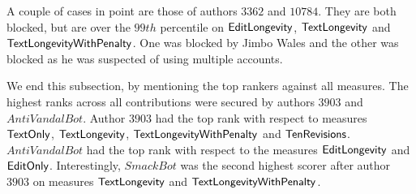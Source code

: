 A couple of cases in point are those of authors $3362$ and 
$10784$.
They are both blocked, but are over the $99th$ percentile on 
$\mathsf{EditLongevity}$, $\mathsf{TextLongevity}$ and $\mathsf{TextLongevityWithPenalty}$.
One was blocked by Jimbo Wales and the other was blocked as he
was suspected of using multiple accounts.

We end this subsection, by mentioning the top rankers against all
measures.
The highest ranks across all contributions were secured by
authors $3903$ and $AntiVandalBot$.
Author $3903$ had the top rank with respect to measures
$\mathsf{TextOnly}$, $\mathsf{TextLongevity}$, $\mathsf{TextLongevityWithPenalty}$ and $\mathsf{TenRevisions}$.
$AntiVandalBot$ had the top rank with respect to the measures
$\mathsf{EditLongevity}$ and $\mathsf{EditOnly}$.
Interestingly, $SmackBot$ was the second highest scorer after
author $3903$ on measures $\mathsf{TextLongevity}$ and $\mathsf{TextLongevityWithPenalty}$.
